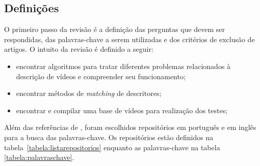 \subsection{Definições}

O primeiro passo da revisão é a definição das perguntas que devem ser respondidas, das palavras-chave a serem utilizadas e dos critérios de exclusão de artigos. O intuito da revisão é definido a seguir:

\begin{itemize}
\item encontrar algoritmos para tratar diferentes problemas relacionados à descrição de vídeos e compreender seu funcionamento;
\item encontrar métodos de \textit{matching} de descritores;
\item encontrar e compilar uma base de vídeos para realização dos testes;
\end{itemize}

Além das referências de \citeauthor{sylvio2015}, foram escolhidos repositórios em português e em inglês para a busca das palavras-chave. Os repositórios estão definidos na tabela~\ref{tabela:listarepositorios} enquanto as palavras-chave na tabela \ref{tabela:palavraschave}.

\begin{table}[h]
\caption[Lista de repositórios utilizados]{Lista de repositórios utilizados.}
\label{tabela:listarepositorios}
\end{table}

\begin{table}[h]
\caption{Palavras-chave utilizadas na revisão sistemática.}
\label{tabela:palavraschave}
\end{table}


